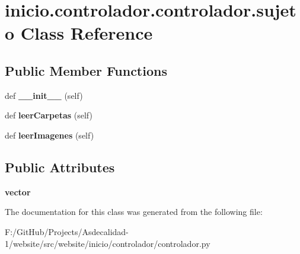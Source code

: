 \hypertarget{classinicio_1_1controlador_1_1controlador_1_1sujeto}{}\section{inicio.\+controlador.\+controlador.\+sujeto Class Reference}
\label{classinicio_1_1controlador_1_1controlador_1_1sujeto}
\subsection*{Public Member Functions}
\begin{DoxyCompactItemize}
\item 
\mbox{\label{classinicio_1_1controlador_1_1controlador_1_1sujeto_a038d0ffbccc3cebebd62399b2dedbf24}} 
def {\bfseries \+\_\+\+\_\+init\+\_\+\+\_\+} (self)
\item 
\mbox{\label{classinicio_1_1controlador_1_1controlador_1_1sujeto_ae39c95a044b8a11fdb2247e2d92a12e7}} 
def {\bfseries leer\+Carpetas} (self)
\item 
\mbox{\label{classinicio_1_1controlador_1_1controlador_1_1sujeto_a7380175285a8bf3bb1483634bde13097}} 
def {\bfseries leer\+Imagenes} (self)
\end{DoxyCompactItemize}
\subsection*{Public Attributes}
\begin{DoxyCompactItemize}
\item 
\mbox{\label{classinicio_1_1controlador_1_1controlador_1_1sujeto_a7a99e4c46254bf3e76a991ba38a1da20}} 
{\bfseries vector}
\end{DoxyCompactItemize}


The documentation for this class was generated from the following file\+:\begin{DoxyCompactItemize}
\item 
F\+:/\+Git\+Hub/\+Projects/\+Asdecalidad-\/1/website/src/website/inicio/controlador/controlador.\+py\end{DoxyCompactItemize}
